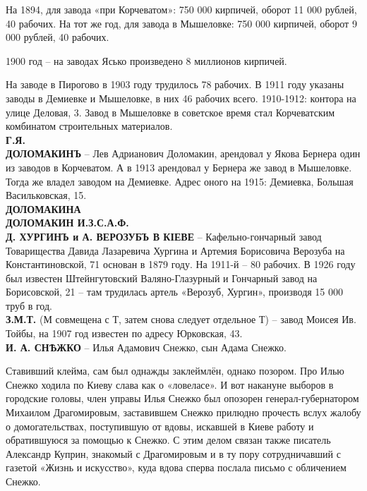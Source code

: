 На 1894, для завода «при Корчеватом»: 750 000 кирпичей, оборот 11 000 рублей, 40 рабочих. На тот же год, для завода в Мышеловке: 750 000 кирпичей, оборот 9 000 рублей, 40 рабочих.

1900 год – на заводах Ясько произведено 8 миллионов кирпичей.

На заводе в Пирогово в 1903 году трудилось 78 рабочих. В 1911 году указаны заводы в Демиевке и Мышеловке, в них 46 рабочих всего. 1910-1912: контора на улице Деловая, 3. Завод в Мышеловке в советское время стал Корчеватским комбинатом строительных материалов.\\

\noindent\textbf{Г.Я.}\\

\noindent\textbf{ДОЛОМАКИНЪ} – Лев Адрианович Доломакин, арендовал у Якова Бернера один из заводов в Корчеватом. А в 1913 арендовал у Бернера же завод в Мышеловке. Тогда же владел заводом на Демиевке. Адрес оного на 1915: Демиевка, Большая Васильковская, 15.\\

\noindent\textbf{ДОЛОМАКИНА}\\

\noindent\textbf{ДОЛОМАКИН И.З.С.А.Ф.}\\

\noindent\textbf{Д. ХУРГИНЪ и А. ВЕРОЗУБЪ В КІЕВЕ} – Кафельно-гончарный завод Товарищества Давида Лазаревича Хургина и Артемия Борисовича Верозуба на Константиновской, 71 основан в 1879 году. На 1911-й – 80 рабочих. В 1926 году был известен Штейнгутовский Валяно-Глазурный и Гончарный завод на Борисовской, 21 – там трудилась артель «Верозуб, Хургин», производя 15 000 труб в год.\\
 
\noindent\textbf{З.М.Т.} (М совмещена с Т, затем снова следует отдельное Т) – завод Моисея Ив. Тойбы, на 1907 год известен по адресу Юрковская, 43.\\


\noindent\textbf{И. А. СНѢЖКО} – Илья Адамович Снежко, сын Адама Снежко.

Ставивший клейма, сам был однажды заклеймлён, однако позором. Про Илью Снежко ходила по Киеву слава как о «ловеласе». И вот накануне выборов в городские головы, член управы Илья Снежко был опозорен генерал-губернатором Михаилом Драгомировым, заставившем Снежко прилюдно прочесть вслух жалобу о домогательствах, поступившую от вдовы, искавшей в Киеве работу и обратившуюся за помощью к Снежко. С этим делом связан также писатель Александр Куприн, знакомый с Драгомировым и в ту пору сотрудничавший с газетой «Жизнь и искусство», куда вдова сперва послала письмо с обличением Снежко.\\

